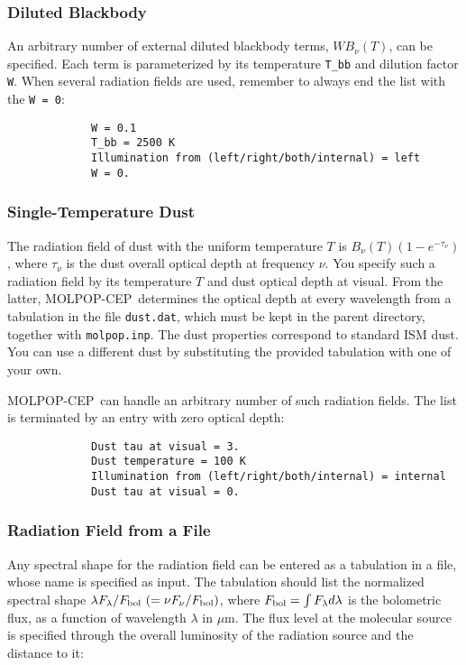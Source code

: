 \documentclass[12pt]{article}
\def\separation {0.5cm}
\def\mic      {\hbox{$\mu$m}}
\def\M{MOLPOP-CEP}
\begin{document}
\subsubsection{Diluted Blackbody}

An arbitrary number of external diluted blackbody terms, $WB_\nu(T)$, can be
specified. Each term is parameterized by its temperature \texttt{T\_bb} and
dilution factor \texttt{W}. When several radiation fields are used, remember to
always end the list with the \texttt{W = 0}:

\vspace{\separation}
\begin{verbatim}
             W = 0.1
             T_bb = 2500 K
             Illumination from (left/right/both/internal) = left
             W = 0.
\end{verbatim}

\subsubsection{Single-Temperature Dust}

The radiation field of dust with the uniform temperature $T$ is $B_\nu(T)(1 -
e^{-\tau_\nu})$, where $\tau_\nu$ is the dust overall optical depth at
frequency $\nu$.  You specify such a radiation field by its temperature $T$ and
dust optical depth at visual. From the latter, \M\ determines the optical depth
at every wavelength from a tabulation in the file {\tt dust.dat}, which must be
kept in the parent directory, together with {\tt molpop.inp}. The dust
properties correspond to standard ISM dust. You can use a different dust by
substituting the provided tabulation with one of your own.

\M\ can handle an arbitrary number of such radiation fields. The list is
terminated by an entry with zero optical depth:

\vspace{\separation}
\begin{verbatim}
             Dust tau at visual = 3.
             Dust temperature = 100 K
             Illumination from (left/right/both/internal) = internal
             Dust tau at visual = 0.
\end{verbatim}

\subsubsection{Radiation Field from a File}

Any spectral shape for the radiation field can be entered as a tabulation in a
file, whose name is specified as input. The tabulation should list the
normalized spectral shape $\lambda F_\lambda/F_{\rm bol}\ (= \nu F_\nu/F_{\rm
bol})$, where $F_{\rm bol} = \int F_\lambda d\lambda$ is the bolometric flux,
as a function of wavelength $\lambda$ in \mic. The flux level at the molecular
source is specified through the overall luminosity of the radiation source and
the distance to it:
\end{document}
